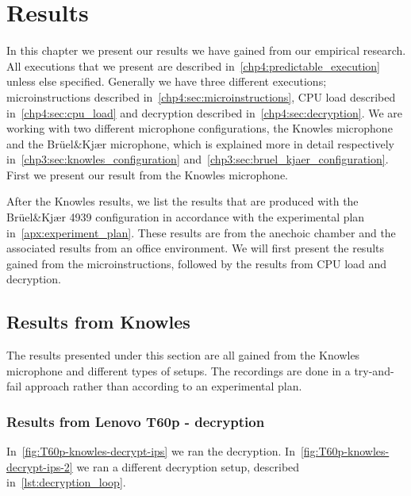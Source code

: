 \chapter{Results}
\label{chp5:results} 
In this chapter we present our results we have gained from our empirical research. 
All executions that we present are described in~\autoref{chp4:predictable_execution} unless else specified. 
Generally we have three different executions; microinstructions described in~\autoref{chp4:sec:microinstructions}, CPU load described in~\autoref{chp4:sec:cpu_load} and decryption described in~\autoref{chp4:sec:decryption}. 
We are working with two different microphone configurations, the Knowles microphone and the Brüel\&Kjær microphone, which is explained more in detail respectively in~\autoref{chp3:sec:knowles_configuration} and~\autoref{chp3:sec:bruel_kjaer_configuration}.
First we present our result from the Knowles microphone.

After the Knowles results, we list the results that are produced with the Brüel\&Kjær 4939 configuration in accordance with the experimental plan in~\autoref{apx:experiment_plan}. 
These results are from the anechoic chamber and the associated results from an office environment.  
We will first present the results gained from the microinstructions, followed by the results from CPU load and decryption. 

\section{Results from Knowles}\label{chp5:sec:knowles_results}
The results presented under this section are all gained from the Knowles microphone and different types of setups.
The recordings are done in a try-and-fail approach rather than according to an experimental plan. 

\subsection{Results from Lenovo T60p - decryption}\label{chp5:subsec:t60p_knowles_results_decryption}
In~\autoref{fig:T60p-knowles-decrypt-ips} we ran the decryption. 
In~\autoref{fig:T60p-knowles-decrypt-ips-2} we ran a different decryption setup, described in~\autoref{lst:decryption_loop}.

